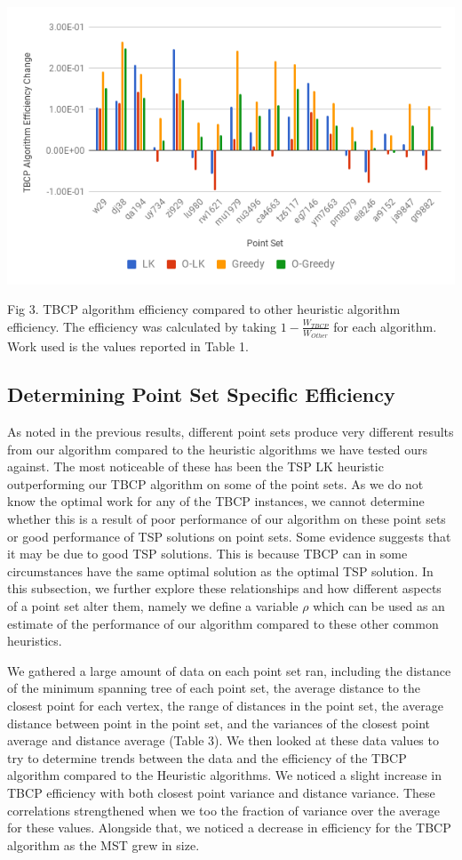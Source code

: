 \documentclass[sigconf, anonymous, pdftex]{acmart}
\begin{document}
\includegraphics[scale = .38]{TBCPEffeciency}

Fig 3. TBCP algorithm efficiency compared to other heuristic algorithm efficiency. The efficiency was calculated by taking $1 - \frac{W_{TBCP}}{W_{Other}}$ for each algorithm. Work used is the values reported in Table 1.

\subsection{Determining Point Set Specific Efficiency}

As noted in the previous results, different point sets produce very different results from our algorithm compared to the heuristic algorithms we have tested ours against. The most noticeable of these has been the TSP LK heuristic outperforming our TBCP algorithm on some of the point sets. As we do not know the optimal work for any of the TBCP instances, we cannot determine whether this is a result of poor performance of our algorithm on these point sets or good performance of TSP solutions on point sets. Some evidence suggests that it may be due to good TSP solutions. This is because TBCP can in some circumstances have the same optimal solution as the optimal TSP solution. In this subsection, we further explore these relationships and how different aspects of a point set alter them, namely we define a variable $\rho$ which can be used as an estimate of the performance of our algorithm compared to these other common heuristics. 

We gathered a large amount of data on each point set ran, including the distance of the minimum spanning tree of each point set, the average distance to the closest point for each vertex, the range of distances in the point set, the average distance between point in the point set, and the variances of the closest point average and distance average (Table 3). We then looked at these data values to try to determine trends between the data and the efficiency of the TBCP algorithm compared to the Heuristic algorithms. We noticed a slight increase in TBCP efficiency with both closest point variance and distance variance. These correlations strengthened when we too the fraction of variance over the average for these values. Alongside that, we noticed a decrease in efficiency for the TBCP algorithm as the MST grew in size.
\end{document}
